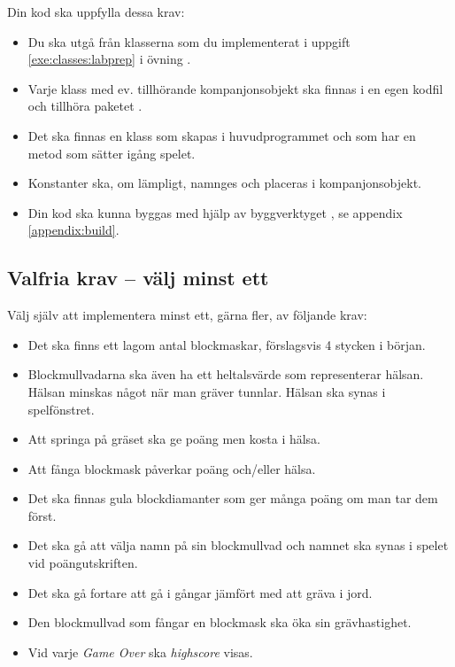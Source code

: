\vspace{1em}\noindent Din kod ska uppfylla dessa krav:
\begin{itemize}[nosep, label={$\square$}]
\item Du ska utgå från klasserna som du implementerat i uppgift \ref{exe:classes:labprep} i övning \texttt{\ExeWeekFIVE}.
\item Varje klass med ev. tillhörande kompanjonsobjekt ska finnas i en egen kodfil och tillhöra paketet .
\item Det ska finnas en klass  som skapas i huvudprogrammet och som har en metod  som sätter igång spelet.
\item Konstanter ska, om lämpligt, namnges och placeras i kompanjonsobjekt.
\item Din kod ska kunna byggas med hjälp av byggverktyget , se appendix \ref{appendix:build}.
\end{itemize}


\subsection{Valfria krav -- välj minst ett}

Välj själv att implementera minst ett, gärna fler, av följande krav:
\begin{itemize}[nosep, label={$\square$}]
\item Det ska finns ett lagom antal blockmaskar, förslagsvis 4 stycken i början.
\item Blockmullvadarna ska även ha ett heltalsvärde som representerar hälsan. Hälsan minskas något när man gräver tunnlar. Hälsan ska synas i spelfönstret.
\item Att springa på gräset ska ge poäng men kosta i hälsa.
\item Att fånga blockmask påverkar poäng och/eller hälsa.
\item Det ska finnas gula blockdiamanter som ger många poäng om man tar dem först.
\item Det ska gå att välja namn på sin blockmullvad och namnet ska synas i spelet vid poängutskriften.
\item Det ska gå fortare att gå i gångar jämfört med att gräva i jord.
\item Den blockmullvad som fångar en blockmask ska öka sin grävhastighet.
\item Vid varje \emph{Game Over} ska \emph{highscore} visas.
\end{itemize}

